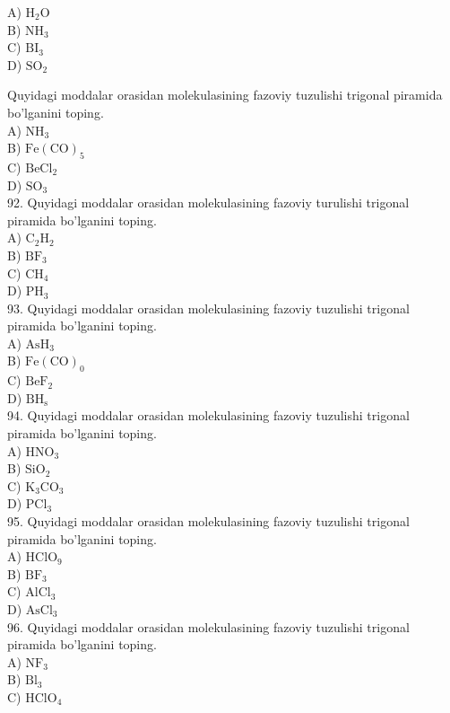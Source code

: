 A) $\mathrm{H}_{2} \mathrm{O}$\\
B) $\mathrm{NH}_{3}$\\
C) $\mathrm{BI}_{3}$\\
D) $\mathrm{SO}_{2}$
  \item Quyidagi moddalar orasidan molekulasining fazoviy tuzulishi trigonal piramida bo'lganini toping.\\
A) $\mathrm{NH}_{3}$\\
B) $\mathrm{Fe}(\mathrm{CO})_{5}$\\
C) $\mathrm{BeCl}_{2}$\\
D) $\mathrm{SO}_{3}$\\
92. Quyidagi moddalar orasidan molekulasining fazoviy turulishi trigonal piramida bo'lganini toping.\\
A) $\mathrm{C}_{2} \mathrm{H}_{2}$\\
B) $\mathrm{BF}_{3}$\\
C) $\mathrm{CH}_{4}$\\
D) $\mathrm{PH}_{3}$\\
93. Quyidagi moddalar orasidan molekulasining fazoviy tuzulishi trigonal piramida bo'lganini toping.\\
A) $\mathrm{AsH}_{3}$\\
B) $\mathrm{Fe}(\mathrm{CO})_{0}$\\
C) $\mathrm{BeF}_{2}$\\
D) $\mathrm{BH}_{\mathrm{s}}$\\
94. Quyidagi moddalar orasidan molekulasining fazoviy tuzulishi trigonal piramida bo'lganini toping.\\
A) $\mathrm{HNO}_{3}$\\
B) $\mathrm{SiO}_{2}$\\
C) $\mathrm{K}_{3} \mathrm{CO}_{3}$\\
D) $\mathrm{PCl}_{3}$\\
95. Quyidagi moddalar orasidan molekulasining fazoviy tuzulishi trigonal piramida bo'lganini toping.\\
A) $\mathrm{HClO}_{9}$\\
B) $\mathrm{BF}_{3}$\\
C) $\mathrm{AlCl}_{3}$\\
D) $\mathrm{AsCl}_{3}$\\
96. Quyidagi moddalar orasidan molekulasining fazoviy tuzulishi trigonal piramida bo'lganini toping.\\
A) $\mathrm{NF}_{3}$\\
B) $\mathrm{Bl}_{3}$\\
C) $\mathrm{HClO}_{4}$\\
